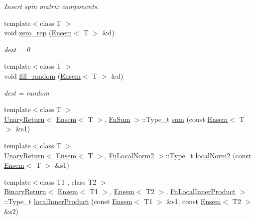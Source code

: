 \begin{DoxyCompactItemize}
\begin{DoxyCompactList}\small\item\em Insert spin matrix components. \end{DoxyCompactList}\item 
{\footnotesize template$<$class T $>$ }\\void \mbox{\hyperlink{group__eensem_gafc79cdca8881b76b79874dce8e6a3816}{zero\+\_\+rep}} (\mbox{\hyperlink{classENSEM_1_1Ensem}{Ensem}}$<$ T $>$ \&d)
\begin{DoxyCompactList}\small\item\em dest = 0 \end{DoxyCompactList}\item 
{\footnotesize template$<$class T $>$ }\\void \mbox{\hyperlink{group__eensem_gaa016282cc53ea94b4fc28c2714c30294}{fill\+\_\+random}} (\mbox{\hyperlink{classENSEM_1_1Ensem}{Ensem}}$<$ T $>$ \&d)
\begin{DoxyCompactList}\small\item\em dest = random \end{DoxyCompactList}\item 
{\footnotesize template$<$class T $>$ }\\\mbox{\hyperlink{structENSEM_1_1UnaryReturn}{Unary\+Return}}$<$ \mbox{\hyperlink{classENSEM_1_1Ensem}{Ensem}}$<$ T $>$, \mbox{\hyperlink{structENSEM_1_1FnSum}{Fn\+Sum}} $>$\+::Type\+\_\+t \mbox{\hyperlink{group__eensem_gac055c3d3de5296fcc478482fc09633ce}{sum}} (const \mbox{\hyperlink{classENSEM_1_1Ensem}{Ensem}}$<$ T $>$ \&s1)
\item 
{\footnotesize template$<$class T $>$ }\\\mbox{\hyperlink{structENSEM_1_1UnaryReturn}{Unary\+Return}}$<$ \mbox{\hyperlink{classENSEM_1_1Ensem}{Ensem}}$<$ T $>$, \mbox{\hyperlink{structENSEM_1_1FnLocalNorm2}{Fn\+Local\+Norm2}} $>$\+::Type\+\_\+t \mbox{\hyperlink{group__eensem_gadea3947facb136bb23ca06c2e6e09400}{local\+Norm2}} (const \mbox{\hyperlink{classENSEM_1_1Ensem}{Ensem}}$<$ T $>$ \&s1)
\item 
{\footnotesize template$<$class T1 , class T2 $>$ }\\\mbox{\hyperlink{structENSEM_1_1BinaryReturn}{Binary\+Return}}$<$ \mbox{\hyperlink{classENSEM_1_1Ensem}{Ensem}}$<$ T1 $>$, \mbox{\hyperlink{classENSEM_1_1Ensem}{Ensem}}$<$ T2 $>$, \mbox{\hyperlink{structENSEM_1_1FnLocalInnerProduct}{Fn\+Local\+Inner\+Product}} $>$\+::Type\+\_\+t \mbox{\hyperlink{group__eensem_ga5f487a5a9eb850aeb6bbd0375d54615c}{local\+Inner\+Product}} (const \mbox{\hyperlink{classENSEM_1_1Ensem}{Ensem}}$<$ T1 $>$ \&s1, const \mbox{\hyperlink{classENSEM_1_1Ensem}{Ensem}}$<$ T2 $>$ \&s2)

\end{DoxyCompactItemize}
